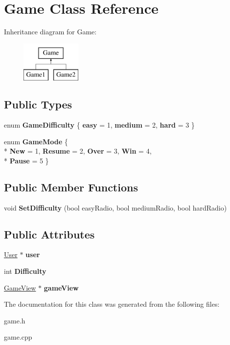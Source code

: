 \hypertarget{classGame}{\section{Game Class Reference}
\label{classGame}
}
Inheritance diagram for Game\-:\begin{figure}[H]
\begin{center}
\leavevmode
\includegraphics[height=2.000000cm]{classGame}
\end{center}
\end{figure}
\subsection*{Public Types}
\begin{DoxyCompactItemize}
\item 
enum {\bfseries Game\-Difficulty} \{ {\bfseries easy} = 1, 
{\bfseries medium} = 2, 
{\bfseries hard} = 3
 \}
\item 
enum {\bfseries Game\-Mode} \{ \\*
{\bfseries New} = 1, 
{\bfseries Resume} = 2, 
{\bfseries Over} = 3, 
{\bfseries Win} = 4, 
\\*
{\bfseries Pause} = 5
 \}
\end{DoxyCompactItemize}
\subsection*{Public Member Functions}
\begin{DoxyCompactItemize}
\item 
\hypertarget{classGame_a540a40b348041ce60ba1214cb61e5118}{void {\bfseries Set\-Difficulty} (bool easy\-Radio, bool medium\-Radio, bool hard\-Radio)}\label{classGame_a540a40b348041ce60ba1214cb61e5118}

\end{DoxyCompactItemize}
\subsection*{Public Attributes}
\begin{DoxyCompactItemize}
\item 
\hypertarget{classGame_af5aeb877034a1c72a571750907358b41}{\hyperlink{classUser}{User} $\ast$ {\bfseries user}}\label{classGame_af5aeb877034a1c72a571750907358b41}

\item 
\hypertarget{classGame_ad02dbd2a814db8589c53b059d4201fe7}{int {\bfseries Difficulty}}\label{classGame_ad02dbd2a814db8589c53b059d4201fe7}

\item 
\hypertarget{classGame_a06ea7da9354fa9d08731a3db219d2566}{\hyperlink{classGameView}{Game\-View} $\ast$ {\bfseries game\-View}}\label{classGame_a06ea7da9354fa9d08731a3db219d2566}

\end{DoxyCompactItemize}


The documentation for this class was generated from the following files\-:\begin{DoxyCompactItemize}
\item 
game.\-h\item 
game.\-cpp\end{DoxyCompactItemize}

